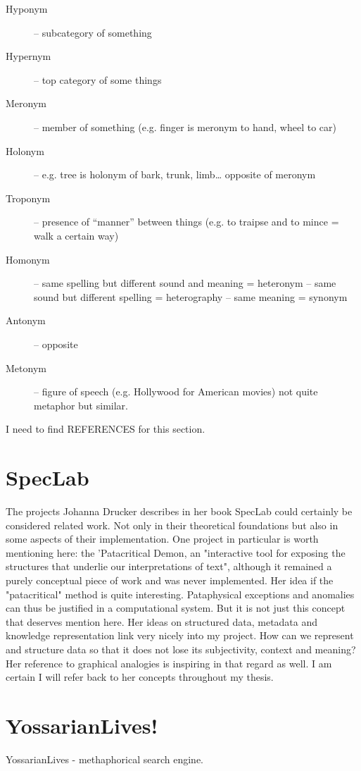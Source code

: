 \begin{description}
  \item [Hyponym] – subcategory of something
  \item [Hypernym] – top category of some things
  \item [Meronym] – member of something (e.g. finger is meronym to hand, wheel to car)
  \item [Holonym] – e.g. tree is holonym of bark, trunk, limb… opposite of meronym
  \item [Troponym] – presence of “manner” between things (e.g. to traipse and to mince = walk a certain way)
  \item [Homonym] – same spelling but different sound and meaning = heteronym – same sound but different spelling = heterography – same meaning = synonym
  \item [Antonym] – opposite
  \item [Metonym] – figure of speech (e.g. Hollywood for American movies) not quite metaphor but similar.
\end{description}

I need to find REFERENCES for this section.


\section*{SpecLab}

The projects Johanna Drucker describes in her book SpecLab \citep{Drucker2009}  could certainly be considered related work. Not only in their theoretical foundations but also in some aspects of their implementation. One project in particular is worth mentioning here: the 'Patacritical Demon, an "interactive tool for exposing the structures that underlie our interpretations of text", although it remained a purely conceptual piece of work and was never implemented. Her idea if the "patacritical" method is quite interesting. Pataphysical exceptions and anomalies can thus be justified in a computational system. But it is not just this concept that deserves mention here.
Her ideas on structured data, metadata and knowledge representation link very nicely into my project. How can we represent and structure data so that it does not lose its subjectivity, context and meaning? Her reference to graphical analogies is inspiring in that regard as well. I am certain I will refer back to her concepts throughout my thesis.

\section*{YossarianLives!}

YossarianLives - methaphorical search engine.
